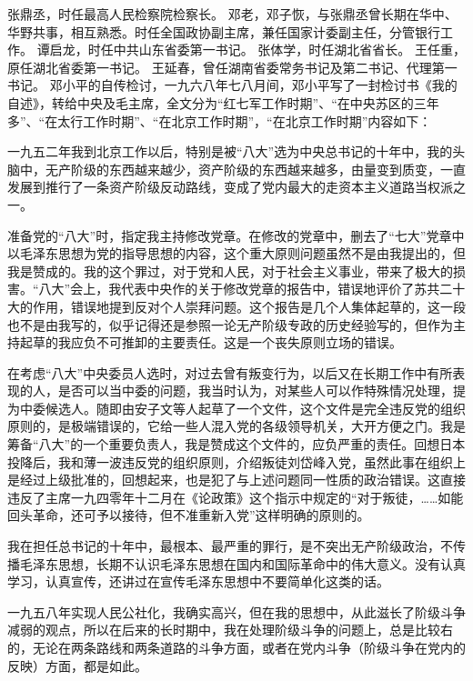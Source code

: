 \begin{maonote}
张鼎丞，时任最高人民检察院检察长。
邓老，邓子恢，与张鼎丞曾长期在华中、华野共事，相互熟悉。时任全国政协副主席，兼任国家计委副主任，分管银行工作。
谭启龙，时任中共山东省委第一书记。
张体学，时任湖北省省长。
王任重，原任湖北省委第一书记。
王延春，曾任湖南省委常务书记及第二书记、代理第一书记。
邓小平的自传检讨，一九六八年七八月间，邓小平写了一封检讨书《我的自述》，转给中央及毛主席，全文分为“红七军工作时期”、“在中央苏区的三年多”、“在太行工作时期”、“在北京工作时期”，“在北京工作时期”内容如下：

一九五二年我到北京工作以后，特别是被“八大”选为中央总书记的十年中，我的头脑中，无产阶级的东西越来越少，资产阶级的东西越来越多，由量变到质变，一直发展到推行了一条资产阶级反动路线，变成了党内最大的走资本主义道路当权派之一。

准备党的“八大”时，指定我主持修改党章。在修改的党章中，删去了“七大”党章中以毛泽东思想为党的指导思想的内容，这个重大原则问题虽然不是由我提出的，但我是赞成的。我的这个罪过，对于党和人民，对于社会主义事业，带来了极大的损害。“八大”会上，我代表中央作的关于修改党章的报告中，错误地评价了苏共二十大的作用，错误地提到反对个人崇拜问题。这个报告是几个人集体起草的，这一段也不是由我写的，似乎记得还是参照一论无产阶级专政的历史经验写的，但作为主持起草的我应负不可推卸的主要责任。这是一个丧失原则立场的错误。

在考虑“八大”中央委员人选时，对过去曾有叛变行为，以后又在长期工作中有所表现的人，是否可以当中委的问题，我当时认为，对某些人可以作特殊情况处理，提为中委候选人。随即由安子文等人起草了一个文件，这个文件是完全违反党的组织原则的，是极端错误的，它给一些人混入党的各级领导机关，大开方便之门。我是筹备“八大”的一个重要负责人，我是赞成这个文件的，应负严重的责任。回想日本投降后，我和薄一波违反党的组织原则，介绍叛徒刘岱峰入党，虽然此事在组织上是经过上级批准的，回想起来，也是犯了与上述问题同一性质的政治错误。这直接违反了主席一九四零年十二月在《论政策》这个指示中规定的“对于叛徒，……如能回头革命，还可予以接待，但不准重新入党”这样明确的原则的。

我在担任总书记的十年中，最根本、最严重的罪行，是不突出无产阶级政治，不传播毛泽东思想，长期不认识毛泽东思想在国内和国际革命中的伟大意义。没有认真学习，认真宣传，还讲过在宣传毛泽东思想中不要简单化这类的话。

一九五八年实现人民公社化，我确实高兴，但在我的思想中，从此滋长了阶级斗争减弱的观点，所以在后来的长时期中，我在处理阶级斗争的问题上，总是比较右的，无论在两条路线和两条道路的斗争方面，或者在党内斗争（阶级斗争在党内的反映）方面，都是如此。


\end{maonote}
